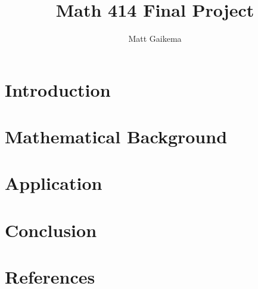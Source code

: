 \documentclass{article}
\title{Math 414 Final Project}
\author{Matt Gaikema}
\date{}
\begin{document}
\maketitle

\section{Introduction}

\section{Mathematical Background}

\section{Application}

\section{Conclusion}

\section{References}
\end{document}
